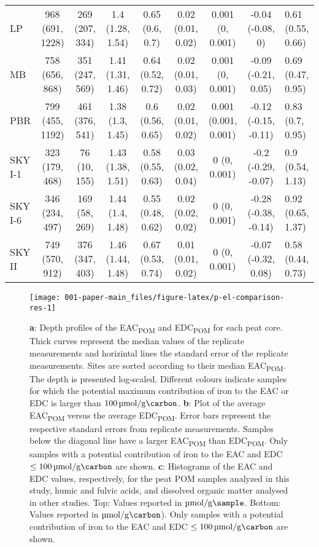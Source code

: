 \documentclass[draft,linenumbers]{agujournal2018}
\begin{document}
\begin{landscape}
\begin{table}
{\begin{tabular}[t]{lcccccccl}
LP & 968 (691, 1228) & 269 (207, 334) & 1.4 (1.28, 1.54) & 0.65 (0.6, 0.7) & 0.02 (0.01, 0.02) & 0.001 (0, 0.001) & -0.04 (-0.08, 0) & 0.61 (0.55, 0.66)\\
\addlinespace
MB & 758 (656, 868) & 351 (247, 569) & 1.41 (1.31, 1.46) & 0.64 (0.52, 0.72) & 0.02 (0.01, 0.03) & 0.001 (0, 0.001) & -0.09 (-0.21, 0.05) & 0.69 (0.47, 0.95)\\
PBR & 799 (455, 1192) & 461 (376, 541) & 1.38 (1.3, 1.45) & 0.6 (0.56, 0.65) & 0.02 (0.01, 0.02) & 0.001 (0.001, 0.001) & -0.12 (-0.15, -0.11) & 0.83 (0.7, 0.95)\\
SKY I-1 & 323 (179, 468) & 76 (10, 155) & 1.43 (1.38, 1.51) & 0.58 (0.55, 0.63) & 0.03 (0.02, 0.04) & 0 (0, 0.001) & -0.2 (-0.29, -0.07) & 0.9 (0.54, 1.13)\\
SKY I-6 & 346 (234, 497) & 169 (58, 269) & 1.44 (1.4, 1.48) & 0.55 (0.48, 0.62) & 0.02 (0.02, 0.02) & 0 (0, 0.001) & -0.28 (-0.38, -0.14) & 0.92 (0.65, 1.37)\\
SKY II & 749 (570, 912) & 376 (347, 403) & 1.46 (1.44, 1.48) & 0.67 (0.53, 0.74) & 0.01 (0.01, 0.02) & 0 (0, 0.001) & -0.07 (-0.32, 0.08) & 0.58 (0.44, 0.73)\\
\bottomrule
\end{tabular}}
\end{table}
\end{landscape}

\begin{figure}[H]

{\centering \texttt{[image: 001-paper-main\_files/figure-latex/p-el-comparison-res-1]} 

}

\caption{\textbf{a}: Depth profiles of the EAC\textsubscript{POM} and EDC\textsubscript{POM} for each peat core. Thick curves represent the median values of the replicate measurements and horizintal lines the standard error of the replicate measurements. Sites are sorted according to their median EAC\textsubscript{POM}. The depth is presented log-scaled. Different colours indicate samples for which the potential maximum contribution of iron to the EAC or EDC is larger than $\SI{100}{\micro\mol\per\gram\carbon}$. \textbf{b}: Plot of the average EAC\textsubscript{POM} versus the average EDC\textsubscript{POM}. Error bars represent the respective standard errors from replicate measurements. Samples below the diagonal line have a larger EAC\textsubscript{POM} than EDC\textsubscript{POM}. Only samples with a potential contribution of iron to the EAC and EDC $\le\SI{100}{\micro\mol\per\gram\carbon}$ are shown. \textbf{c}: Histograms of the EAC and EDC values, respectively, for the peat POM samples analyzed in this study, humic and fulvic acids, and dissolved organic matter analysed in other studies. Top: Values reported in $\si{\micro\mol\per\g\sample}$. Bottom: Values reported in $\si{\micro\mol\per\g\carbon}$). Only samples with a potential contribution of iron to the EAC and EDC $\le\SI{100}{\micro\mol\per\gram\carbon}$ are shown.}\label{fig:p-el-comparison-res}
\end{figure}
\end{document}
